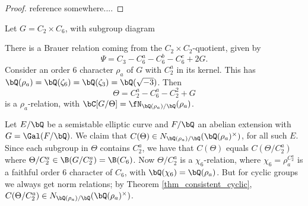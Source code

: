 \begin{proof}
    {\color{red} reference somewhere....}
\end{proof}


\begin{example}
    Let $G = C_2 \times C_6$, with subgroup diagram
    \begin{figure}[H]
        \centering
    \end{figure}
    There is a Brauer relation coming from the $C_2 \times C_2$-quotient, given by $$\Psi = C_3 - C_6^a - C_6^b - C_6^c + 2G.$$ Consider an order $6$ character $\rho_a$ of $G$ with $C_2^{a}$ in its kernel. This has $\bQ(\rho_a) = \bQ(\zeta_6) = \bQ(\zeta_3) = \bQ(\sqrt{-3})$. Then $$\Theta = C_2^{a} - C_6^{a} - C_2^{2} + G$$ is a $\rho_a$-relation, with $\bC[ G / \Theta] = \repnorm{\rho_a}$. 

    Let $E / \bQ$ be a semistable elliptic curve and $F / \bQ$ an abelian extension with $G = \Gal(F / \bQ)$. We claim that $C(\Theta) \in \fieldnorm{\rho_a}$, for all such $E$. Since each subgroup in $\Theta$ contains $C_2^{a}$, we have that $C(\Theta)$ equals $C(\Theta / C_2^{a})$ where $\Theta / C_2^{a} \in \B(G / C_2^{a}) = \B(C_6)$.  Now $\Theta / C_2^{a}$ is a $\chi_6$-relation, where $\chi_6 = \rho_a^{C_2^a}$ is a faithful order $6$ character of $C_6$, with $\bQ(\chi_6) = \bQ(\rho_a)$. But for cyclic groups we always get norm relations; by Theorem \ref{thm_consistent_cyclic}, $C(\Theta / C_2^{a}) \in \fieldnorm{\rho_a}$.


\end{example}
